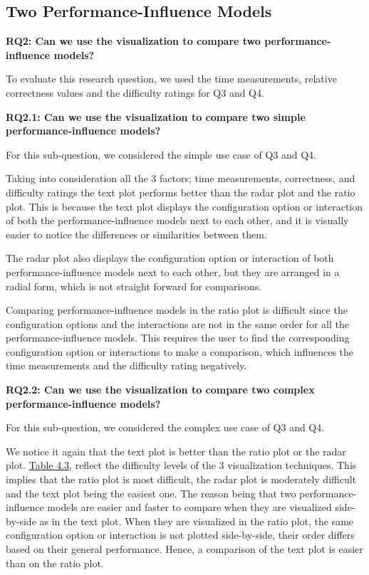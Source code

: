 \subsection*{Two Performance-Influence Models}
\vskip 0.2in
\begin{mdframed}
\textbf{RQ2: Can we use the visualization to compare two performance-influence models?}
\end{mdframed}

To evaluate this research question, we used the time measurements, relative correctness values and the difficulty ratings for Q3 and Q4.

\vskip 0.2in
\begin{mdframed}
\textbf{RQ2.1: Can we use the visualization to compare two simple performance-influence models?}
\end{mdframed}

For this sub-question, we considered the simple use case of Q3 and Q4.

Taking into consideration all the 3 factors; time measurements, correctness, and difficulty ratings the text plot performs better than the radar plot and the ratio plot. This is because the text plot displays the configuration option or interaction of both the performance-influence models next to each other, and it is visually easier to notice the differences or similarities between them. 

The radar plot also displays the configuration option or interaction of both performance-influence models next to each other, but they are arranged in a radial form, which is not straight forward for comparisons.

Comparing performance-influence models in the ratio plot is difficult since the configuration options and the interactions are not in the same order for all the performance-influence models. This requires the user to find the corresponding configuration option or interactions to make a comparison, which influences the time measurements and the difficulty rating negatively.

\vskip 0.2in
\begin{mdframed}
\textbf{RQ2.2: Can we use the visualization to compare two complex performance-influence models?}
\end{mdframed}

For this sub-question, we considered the complex use case of Q3 and Q4.

We notice it again that the text plot is better than the ratio plot or the radar plot. \hyperref[table:rating]{Table 4.3}, reflect the difficulty levels of the 3 visualization techniques. This implies that the ratio plot is most difficult, the radar plot is moderately difficult and the text plot being the easiest one. The reason being that two performance-influence models are easier and faster to compare when they are visualized side-by-side as in the text plot. When they are visualized in the ratio plot, the same configuration option or interaction is not plotted side-by-side, their order differs based on their general performance. Hence, a comparison of the text plot is easier than on the ratio plot. 

